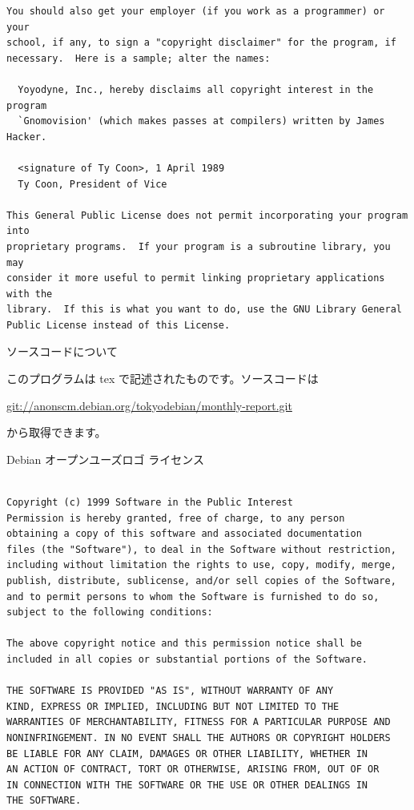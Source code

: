 \documentclass[mingoth,a4paper]{jsarticle}
\begin{document}
\begin{multicols}{2}
\begin{fontsize}{6}{6}
\begin{verbatim}
You should also get your employer (if you work as a programmer) or your
school, if any, to sign a "copyright disclaimer" for the program, if
necessary.  Here is a sample; alter the names:

  Yoyodyne, Inc., hereby disclaims all copyright interest in the program
  `Gnomovision' (which makes passes at compilers) written by James Hacker.

  <signature of Ty Coon>, 1 April 1989
  Ty Coon, President of Vice

This General Public License does not permit incorporating your program into
proprietary programs.  If your program is a subroutine library, you may
consider it more useful to permit linking proprietary applications with the
library.  If this is what you want to do, use the GNU Library General
Public License instead of this License.
 \end{verbatim}
 \end{fontsize}
\end{multicols}

\begin{center}
ソースコードについて
\end{center}

このプログラムは tex で記述されたものです。ソースコードは
\begin{center}
  \url{git://anonscm.debian.org/tokyodebian/monthly-report.git}
\end{center}
から取得できます。

\begin{center}
Debian オープンユーズロゴ ライセンス
\end{center}

\begin{multicols}{2}
 \begin{fontsize}{6}{6}
 \begin{verbatim}

Copyright (c) 1999 Software in the Public Interest
Permission is hereby granted, free of charge, to any person
obtaining a copy of this software and associated documentation
files (the "Software"), to deal in the Software without restriction,
including without limitation the rights to use, copy, modify, merge,
publish, distribute, sublicense, and/or sell copies of the Software,
and to permit persons to whom the Software is furnished to do so,
subject to the following conditions:

The above copyright notice and this permission notice shall be
included in all copies or substantial portions of the Software.

THE SOFTWARE IS PROVIDED "AS IS", WITHOUT WARRANTY OF ANY
KIND, EXPRESS OR IMPLIED, INCLUDING BUT NOT LIMITED TO THE
WARRANTIES OF MERCHANTABILITY, FITNESS FOR A PARTICULAR PURPOSE AND
NONINFRINGEMENT. IN NO EVENT SHALL THE AUTHORS OR COPYRIGHT HOLDERS
BE LIABLE FOR ANY CLAIM, DAMAGES OR OTHER LIABILITY, WHETHER IN
AN ACTION OF CONTRACT, TORT OR OTHERWISE, ARISING FROM, OUT OF OR
IN CONNECTION WITH THE SOFTWARE OR THE USE OR OTHER DEALINGS IN
THE SOFTWARE.
 \end{verbatim}
 \end{fontsize}
\end{multicols}
\end{document}
